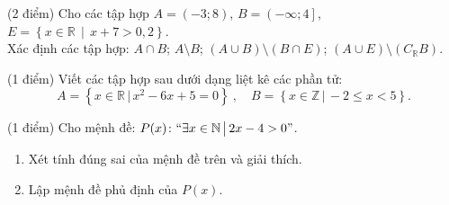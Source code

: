 \begin{bt}%
	(2 điểm) Cho các tập hợp $A=\left(-3;8\right)$, $B=\left(-\infty;4\right]$, $E=\left\{x\in\mathbb{R} \,\middle|\, x+7>0{,}2 \right\}$.\\
	Xác định các tập hợp: $A\cap B$; $A\setminus B$; $\left(A\cup B\right)\setminus\left(B\cap E\right)$; $\left(A\cup E\right)\setminus\left(C_{\mathbb{R}}B\right)$.
	\loigiai{
		Ta có 
		$\begin{aligned}[t]
			& A\cap B=\left( -3;4 \right] \\
			& A\setminus B=\left(4;8\right)\\
			& A\cup B=\left(-\infty;8\right)\\
			& B\cap E=\left(-6{,}8;4\right]\\
			& A\cup E=\left(6{,}8;+\infty\right)\\
			& C_{\mathbb{R}}B=\left(4;+\infty\right)\\
			& \left(A\cup B\right)\setminus\left(B\cap E\right)= \left(-\infty;8\right)\setminus\left(-6{,}8;4\right]= \left(-\infty;-6{,}8\right]\cup\left(4;8\right)\\
			& \left(A\cup E\right)\setminus C_{\mathbb{R}}B= \left(-6{,}8;+\infty\right)\setminus\left(4;+\infty\right)= \left(-6{,}8;4\right].
		\end{aligned}$\\
		}
\end{bt}

\begin{bt}%
	(1 điểm) Viết các tập hợp sau dưới dạng liệt kê các phần tử:
	$$A=\left\{x\in\mathbb{R} \,\big|\, x^2-6x+5=0\right\}\ , \quad B=\left\{x\in\mathbb{Z} \,\big|\, -2\le x<5\right\}.$$
\end{bt}

\begin{bt}%
	(1 điểm) Cho mệnh đề: $P(x)\colon \text{\lq\lq}\exists x\in\mathbb{N} \,\big|\, 2x-4>0\text{\rq\rq}$.
	\begin{enumerate}
		\item Xét tính đúng sai của mệnh đề trên và giải thích.
		\item Lập mệnh đề phủ định của $P(x)$.
	\end{enumerate}
\end{bt}

